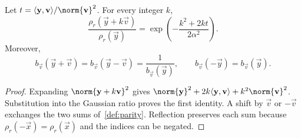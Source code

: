 \begin{lemma}
\label{lem:line}
Let $t=\inner{\vec y}{\vec v}/\norm{\vec v}^2$. For every integer $k$,
\[
 \frac{\rho_r(\vec y+k\vec v)}{\rho_r(\vec y)}
 =\exp\!\left(-\frac{k^2+2kt}{2\alpha^2}\right).
\]
Moreover,
\[
 b_{\vec v}(\vec y+\vec v)=b_{\vec v}(\vec y-\vec v)=\frac1{b_{\vec v}(\vec y)},
 \qquad b_{\vec v}(-\vec y)=b_{\vec v}(\vec y).
\]
\end{lemma}
\begin{proof}
Expanding $\norm{\vec y+k\vec v}^2$ gives $\norm{\vec y}^2+2k\inner{\vec y}{\vec v}+k^2\norm{\vec v}^2$. Substitution into the Gaussian ratio proves the first identity. A shift by $\vec v$ or $-\vec v$ exchanges the two sums of~\cref{def:parity}. Reflection preserves each sum because $\rho_r(-\vec x)=\rho_r(\vec x)$ and the indices can be negated.
\end{proof}
